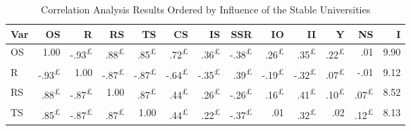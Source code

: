 \documentclass{singlecol-new}
\theoremstyle{TH}{
\newtheorem{lemma}{Lemma}
\newtheorem{theorem}[lemma]{Theorem}
\newtheorem{corrolary}[lemma]{Corrolary}
\newtheorem{conjecture}[lemma]{Conjecture}
\newtheorem{proposition}[lemma]{Proposition}
\newtheorem{claim}[lemma]{Claim}
\newtheorem{stheorem}[lemma]{Wrong Theorem}
\newtheorem{algorithm}{Algorithm}
}
\theoremstyle{THrm}{
\newtheorem{definition}{Definition}[section]
\newtheorem{question}{Question}[section]
\newtheorem{remark}{Remark}
\newtheorem{scheme}{Scheme}
}
\theoremstyle{THhit}{
\newtheorem{case}{Case}[section]
}
\begin{document}
\begin{table*}[h!]
	\centering
	\caption{Correlation Analysis Results Ordered by Influence of the Stable Universities}
	\label{tab:correlation_stable}
	\scriptsize
	\begin{tabular}{lrrrrrrrrrrrr}
		\hline
		\textbf{Var} & \textbf{OS} & \textbf{R} & \textbf{RS} & \textbf{TS} & \textbf{CS} & \textbf{IS} & \textbf{SSR} & \textbf{IO} & \textbf{II} & \textbf{Y} & \textbf{NS} & \textbf{I} \\ \hline
		
		OS & \cellcolor{gray!50}1.00 & \cellcolor{gray!46}-.93\textsuperscript{£} & \cellcolor{gray!44}.88\textsuperscript{£} & \cellcolor{gray!42}.85\textsuperscript{£} & \cellcolor{gray!36}.72\textsuperscript{£} & \cellcolor{gray!18}.36\textsuperscript{£} & \cellcolor{gray!19}-.38\textsuperscript{£} & \cellcolor{gray!13}.26\textsuperscript{£} & \cellcolor{gray!17}.35\textsuperscript{£} & \cellcolor{gray!11}.22\textsuperscript{£} & \cellcolor{gray!0}.01 & 9.90 \\ 
		
		R & \cellcolor{gray!46}-.93\textsuperscript{£} & \cellcolor{gray!50}1.00 & \cellcolor{gray!43}-.87\textsuperscript{£} & \cellcolor{gray!43}-.87\textsuperscript{£} & \cellcolor{gray!32}-.64\textsuperscript{£} & \cellcolor{gray!17}-.35\textsuperscript{£} & \cellcolor{gray!19}.39\textsuperscript{£} & \cellcolor{gray!9}-.19\textsuperscript{£} & \cellcolor{gray!16}-.32\textsuperscript{£} & \cellcolor{gray!3}.07\textsuperscript{£} & \cellcolor{gray!0}-.01 & 9.12 \\ 
		
		RS & \cellcolor{gray!44}.88\textsuperscript{£} & \cellcolor{gray!43}-.87\textsuperscript{£} & \cellcolor{gray!50}1.00 & \cellcolor{gray!43}.87\textsuperscript{£} & \cellcolor{gray!22}.44\textsuperscript{£} & \cellcolor{gray!13}.26\textsuperscript{£} & \cellcolor{gray!13}-.26\textsuperscript{£} & \cellcolor{gray!8}.16\textsuperscript{£} & \cellcolor{gray!20}.41\textsuperscript{£} & \cellcolor{gray!5}.10\textsuperscript{£} & \cellcolor{gray!3}.07\textsuperscript{£} & 8.52 \\ 
		
		TS & \cellcolor{gray!42}.85\textsuperscript{£} & \cellcolor{gray!43}-.87\textsuperscript{£} & \cellcolor{gray!43}.87\textsuperscript{£} & \cellcolor{gray!50}1.00 & \cellcolor{gray!22}.44\textsuperscript{£} & \cellcolor{gray!11}.22\textsuperscript{£} & \cellcolor{gray!18}-.37\textsuperscript{£} & \cellcolor{gray!0}.01 & \cellcolor{gray!16}.32\textsuperscript{£} & \cellcolor{gray!1}.02 & \cellcolor{gray!6}.12\textsuperscript{£} & 8.13 \\ 
		

\end{tabular}
\end{table*}
\end{document}
